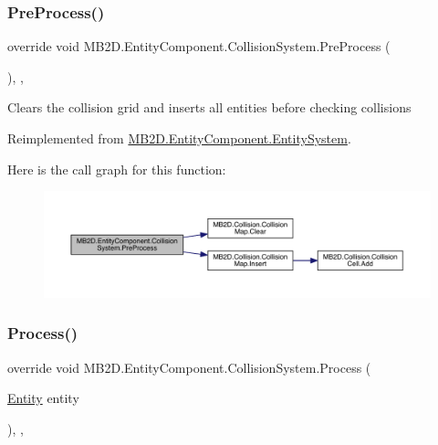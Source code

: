 \subsubsection{\texorpdfstring{Pre\+Process()}{PreProcess()}}
{\footnotesize\ttfamily override void M\+B2\+D.\+Entity\+Component.\+Collision\+System.\+Pre\+Process (\begin{DoxyParamCaption}{ }\end{DoxyParamCaption})\hspace{0.3cm}{\ttfamily [inline]}, {\ttfamily [protected]}, {\ttfamily [virtual]}}



Clears the collision grid and inserts all entities before checking collisions 



Reimplemented from \hyperlink{class_m_b2_d_1_1_entity_component_1_1_entity_system_aadc002dd04d9cb75775ca955a28e303e}{M\+B2\+D.\+Entity\+Component.\+Entity\+System}.

Here is the call graph for this function\+:\nopagebreak
\begin{figure}[H]
\begin{center}
\leavevmode
\includegraphics[width=350pt]{class_m_b2_d_1_1_entity_component_1_1_collision_system_ad591227767c8b6c66ca3891de04e9050_cgraph}
\end{center}
\end{figure}
\hypertarget{class_m_b2_d_1_1_entity_component_1_1_collision_system_adfbee070ed7b120565a5f8a08c159535}{}\label{class_m_b2_d_1_1_entity_component_1_1_collision_system_adfbee070ed7b120565a5f8a08c159535} 
\subsubsection{\texorpdfstring{Process()}{Process()}}
{\footnotesize\ttfamily override void M\+B2\+D.\+Entity\+Component.\+Collision\+System.\+Process (\begin{DoxyParamCaption}\item[{\hyperlink{class_m_b2_d_1_1_entity_component_1_1_entity}{Entity}}]{entity }\end{DoxyParamCaption})\hspace{0.3cm}{\ttfamily [inline]}, {\ttfamily [protected]}, {\ttfamily [virtual]}}



